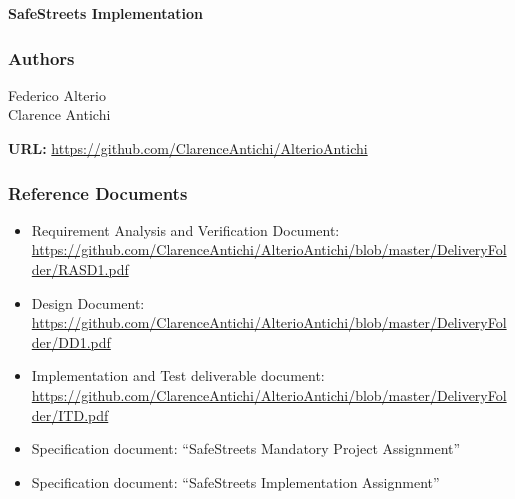 \textbf{SafeStreets Implementation}

\subsubsection{Authors}
Federico Alterio\\
Clarence Antichi

\textbf{URL:} \url{https://github.com/ClarenceAntichi/AlterioAntichi}

\subsubsection{Reference Documents}
\begin{itemize}
	\item Requirement Analysis and Verification Document:\\
	\url{https://github.com/ClarenceAntichi/AlterioAntichi/blob/master/DeliveryFolder/RASD1.pdf}
	\item Design Document:\\
	\url{https://github.com/ClarenceAntichi/AlterioAntichi/blob/master/DeliveryFolder/DD1.pdf}
	\item Implementation and Test deliverable document:
	\url{https://github.com/ClarenceAntichi/AlterioAntichi/blob/master/DeliveryFolder/ITD.pdf}
	\item Specification document: “SafeStreets Mandatory Project Assignment”
	\item Specification document: “SafeStreets Implementation Assignment”
\end{itemize}
